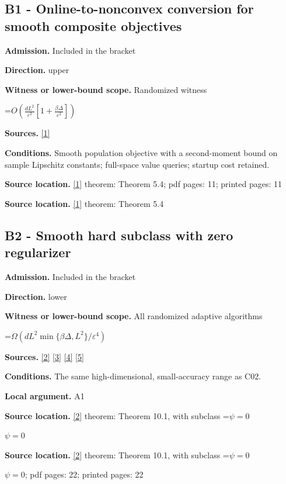 \documentclass[10pt,a4paper]{article}
\newcommand{\AtlasMath}[1]{\par\begingroup\centering\setbox0=\hbox{$\displaystyle #1$}\ifdim\wd0>1.4\linewidth\typeout{ATLAS WIDE FORMULA: \the\wd0}\fi\ifdim\wd0>\linewidth\resizebox{\linewidth}{!}{\box0}\else\box0\fi\par\endgroup}
\newcommand{\AtlasInlineMath}[1]{\begingroup\setbox0=\hbox{$#1$}\ifdim\wd0>.4\linewidth\endgroup\AtlasMath{#1}\else\endgroup$#1$\fi}
\begin{document}
\subsection{B1 - Online-to-nonconvex conversion for smooth composite objectives}
\textbf{Admission.} Included in the bracket

\textbf{Direction.} upper

\textbf{Witness or lower-bound scope.} Randomized witness

\AtlasMath{O\!\left(\frac{dL^2}{\varepsilon^2}\left[1+\frac{\beta\Delta}{\varepsilon^2}\right]\right)}
\textbf{Sources.} \href{https://arxiv.org/abs/2610.12328v1}{[1]}

\textbf{Conditions.} Smooth population objective with a second-moment bound on sample Lipschitz constants; full-space value queries; startup cost retained.

\textbf{Source location.} \href{https://arxiv.org/abs/2610.12328v1}{[1]} theorem: Theorem 5.4; pdf pages: 11; printed pages: 11

\textbf{Source location.} \href{https://arxiv.org/abs/2610.12328v1}{[1]} theorem: Theorem 5.4

\subsection{B2 - Smooth hard subclass with zero regularizer}
\textbf{Admission.} Included in the bracket

\textbf{Direction.} lower

\textbf{Witness or lower-bound scope.} All randomized adaptive algorithms

\AtlasMath{\Omega(dL^2\min\{\beta\Delta,L^2\}/\varepsilon^4)}
\textbf{Sources.} \href{https://arxiv.org/html/2610.19652v1}{[2]} \href{https://arxiv.org/html/2609.00045v3}{[3]} \href{https://arxiv.org/pdf/2610.00245v2}{[4]} \href{https://arxiv.org/html/2610.17074v1}{[5]}

\textbf{Conditions.} The same high-dimensional, small-accuracy range as C02.

\textbf{Local argument.} A1

\textbf{Source location.} \href{https://arxiv.org/html/2610.19652v1}{[2]} theorem: Theorem 10.1, with subclass \AtlasInlineMath{\psi=0}

\textbf{Source location.} \href{https://arxiv.org/html/2610.19652v1}{[2]} theorem: Theorem 10.1, with subclass \AtlasInlineMath{\psi=0}; pdf pages: 22; printed pages: 22
\end{document}
